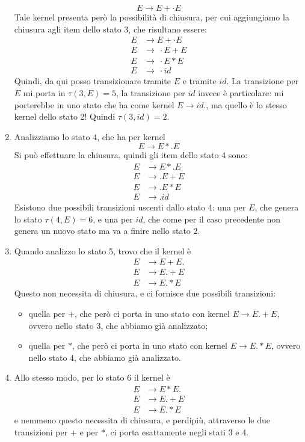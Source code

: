 \documentclass[class=book, crop=false, oneside, 12pt]{standalone}
\begin{document}
\begin{enumerate}
    \begin{equation*}
        E \to E+ \cdot E
    \end{equation*}
    Tale kernel presenta però la possibilità di chiusura, per cui aggiungiamo la chiusura agli item dello stato 3, che risultano essere:
    \begin{align*}
        E &\to E+ \cdot E \\
        E &\to\ \cdot E+E \\
        E &\to\ \cdot E*E \\
        E &\to\ \cdot id
    \end{align*}
    Quindi, da qui posso transizionare tramite \(E\) e tramite \(id\). La transizione per \(E\) mi porta in \(\tau(3,E)=5\), la transizione per \(id\) invece è particolare: mi porterebbe in uno stato che ha come kernel \(E \to id.\), ma quello è lo stesso kernel dello stato 2! Quindi \(\tau(3,id)=2\).
    \item Analizziamo lo stato 4, che ha per kernel
    \begin{equation*}
        E \to E*.E 
    \end{equation*}
    Si può effettuare la chiusura, quindi gli item dello stato 4 sono:
    \begin{align*}
        E &\to E*.E \\ 
        E &\to .E+E \\
        E &\to .E*E \\
        E &\to .id
    \end{align*}
    Esistono due possibili transizioni uscenti dallo stato 4: una per \(E\), che genera lo stato \(\tau(4,E)=6\), e una per \(id\), che come per il caso precedente non genera un nuovo stato ma va a finire nello stato 2.
    \item Quando analizzo lo stato 5, trovo che il kernel è
    \begin{align*}
        E &\to E+E. \\
        E &\to E.+E \\
        E &\to E.*E
    \end{align*}
    Questo non necessita di chiusura, e ci fornisce due possibili transizioni:
    \begin{itemize}
        \item quella per \(+\), che però ci porta in uno stato con kernel \({E \to E.+E}\), ovvero nello stato 3, che abbiamo già analizzato;
        \item quella per \(*\), che però ci porta in uno stato con kernel \({E \to E.*E}\), ovvero nello stato 4, che abbiamo già analizzato.
    \end{itemize}
    \item Allo stesso modo, per lo stato 6 il kernel è
    \begin{align*}
        E &\to E*E. \\
        E &\to E.+E \\
        E &\to E.*E
    \end{align*}
    e nemmeno questo necessita di chiusura, e perdipiù, attraverso le due transizioni per \(+\) e per \(*\), ci porta esattamente negli stati 3 e 4.
\end{enumerate}
\end{document}
